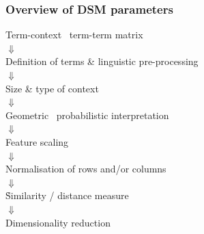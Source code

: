 \documentclass[t]{beamer} %
\begin{document}
\begin{frame}
  \frametitle{Overview of DSM parameters}

  \ungap[1]
  \begin{center}
    Term-context \vs\ term-term matrix\\
    $\Downarrow$\\
    Definition of terms \& linguistic pre-processing\\
    $\Downarrow$\\
    Size \& type of context\\
    $\Downarrow$\\
    Geometric \vs\ probabilistic interpretation\\
    $\Downarrow$\\
    Feature scaling\\
    $\Downarrow$\\
    Normalisation of rows and/or columns\\
    $\Downarrow$\\
    \h{Similarity / distance measure}\\
    $\Downarrow$\\
    Dimensionality reduction
  \end{center}
\end{frame}
\end{document}
